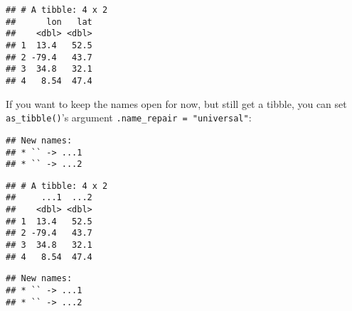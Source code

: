 \documentclass[]{book}
\newenvironment{Shaded}{\begin{snugshade}}{\end{snugshade}}
\newcommand{\DataTypeTok}[1]{\textcolor[rgb]{0.13,0.29,0.53}{#1}}
\newcommand{\DecValTok}[1]{\textcolor[rgb]{0.00,0.00,0.81}{#1}}
\newcommand{\KeywordTok}[1]{\textcolor[rgb]{0.13,0.29,0.53}{\textbf{#1}}}
\newcommand{\NormalTok}[1]{#1}
\newcommand{\OperatorTok}[1]{\textcolor[rgb]{0.81,0.36,0.00}{\textbf{#1}}}
\newcommand{\StringTok}[1]{\textcolor[rgb]{0.31,0.60,0.02}{#1}}
\begin{document}
\begin{Shaded}
\end{Shaded}

\begin{verbatim}
## # A tibble: 4 x 2
##      lon   lat
##    <dbl> <dbl>
## 1  13.4   52.5
## 2 -79.4   43.7
## 3  34.8   32.1
## 4   8.54  47.4
\end{verbatim}

If you want to keep the names open for now, but still get a tibble, you can set \texttt{as\_tibble()}'s argument \texttt{.name\_repair\ =\ "universal"}:

\begin{Shaded}
\end{Shaded}

\begin{verbatim}
## New names:
## * `` -> ...1
## * `` -> ...2
\end{verbatim}

\begin{verbatim}
## # A tibble: 4 x 2
##     ...1  ...2
##    <dbl> <dbl>
## 1  13.4   52.5
## 2 -79.4   43.7
## 3  34.8   32.1
## 4   8.54  47.4
\end{verbatim}

\begin{Shaded}
\end{Shaded}

\begin{verbatim}
## New names:
## * `` -> ...1
## * `` -> ...2
\end{verbatim}
\end{document}
